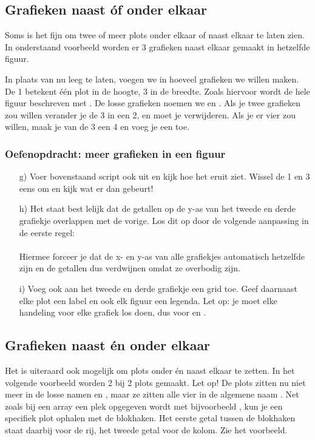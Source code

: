 \documentclass[a4paper,11pt, fleqn]{article}
\begin{document}

\subsection{Grafieken naast \'of onder elkaar}
Soms is het fijn om twee of meer plots onder elkaar of naast elkaar te laten zien. In onderstaand voorbeeld worden er 3 grafieken naast elkaar gemaakt in hetzelfde figuur. 

In plaats van  nu leeg te laten, voegen we in hoeveel grafieken we willen maken. De 1 betekent \'e\'en plot in de hoogte, 3 in de breedte. Zoals hiervoor wordt de hele figuur beschreven met . De losse grafieken noemen we  en . Als je twee grafieken zou willen verander je de 3 in een 2, en moet je  verwijderen. Als je er vier zou willen, maak je van de 3 een 4 en voeg je een  toe.

\subsubsection*{Oefenopdracht: meer grafieken in een figuur}
\begin{itemize}
	\item[g)] Voer bovenstaand script ook uit en kijk hoe het eruit ziet. Wissel de 1 en 3 eens om en kijk wat er dan gebeurt!
	\item[h)] Het staat best lelijk dat de getallen op de y-as van het tweede en derde grafiekje overlappen met de vorige. Los dit op door de volgende aanpassing in de eerste regel:\\
	\\
	Hiermee forceer je dat de x- en y-as van alle grafiekjes automatisch hetzelfde zijn en de getallen dus verdwijnen omdat ze overbodig zijn.
	\item[i)] Voeg ook aan het tweede en derde grafiekje een grid toe. Geef daarnaast elke plot een label en ook elk figuur een legenda. Let op: je moet elke handeling voor elke grafiek los doen, dus voor  en .
\end{itemize}

\subsection{Grafieken naast \'en onder elkaar}
Het is uiteraard ook mogelijk om plots onder \'en naast elkaar te zetten. In het volgende voorbeeld worden 2 bij 2 plots gemaakt. Let op! De plots zitten nu niet meer in de losse namen  en , maar ze zitten alle vier in de algemene naam . Net zoals bij een array een plek opgegeven wordt met bijvoorbeeld \pythoninline{[1]}, kun je een specifiek plot ophalen met de blokhaken. Het eerste getal tussen de blokhaken staat daarbij voor de rij, het tweede getal voor de kolom. Zie het voorbeeld.
\end{document}
